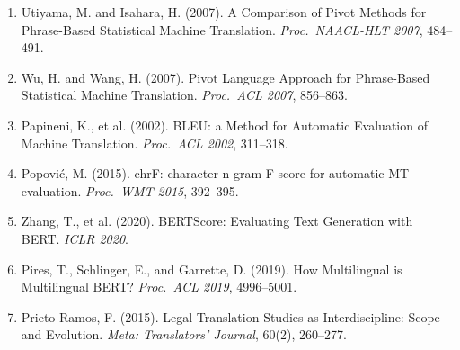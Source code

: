 \documentclass[conference,letterpaper]{IEEEtran}
\begin{document}
\begin{enumerate}
    \item Utiyama, M. and Isahara, H. (2007). A Comparison of Pivot Methods
    for Phrase-Based Statistical Machine Translation. \textit{Proc.\ NAACL-HLT
    2007}, 484--491.

    \item Wu, H. and Wang, H. (2007). Pivot Language Approach for Phrase-Based
    Statistical Machine Translation. \textit{Proc.\ ACL 2007}, 856--863.

    \item Papineni, K., et al. (2002). BLEU: a Method for Automatic Evaluation
    of Machine Translation. \textit{Proc.\ ACL 2002}, 311--318.

    \item Popović, M. (2015). chrF: character n-gram F-score for automatic MT
    evaluation. \textit{Proc.\ WMT 2015}, 392--395.

    \item Zhang, T., et al. (2020). BERTScore: Evaluating Text Generation with
    BERT. \textit{ICLR 2020}.

    \item Pires, T., Schlinger, E., and Garrette, D. (2019). How Multilingual
    is Multilingual BERT? \textit{Proc.\ ACL 2019}, 4996--5001.

    \item Prieto Ramos, F. (2015). Legal Translation Studies as Interdiscipline:
    Scope and Evolution. \textit{Meta: Translators' Journal}, 60(2), 260--277.
\end{enumerate}
\end{document}
